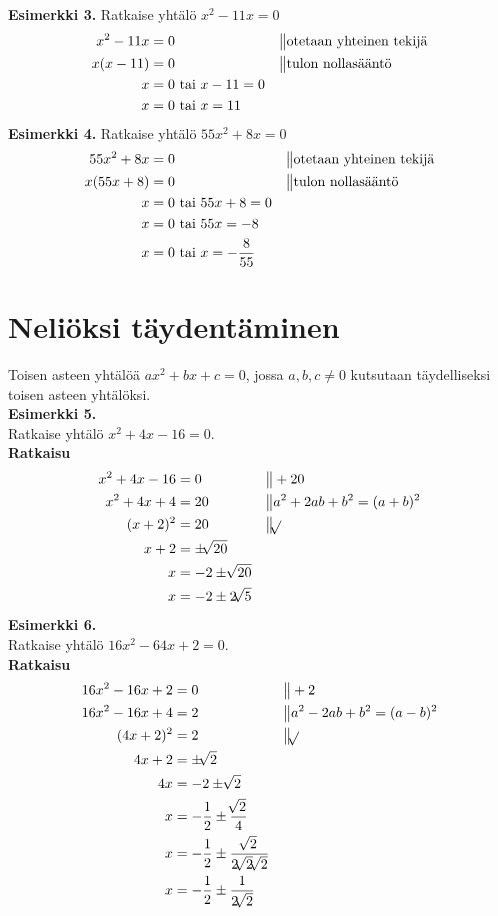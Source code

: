 \textbf{Esimerkki 3.}
Ratkaise yhtälö $x^2-11x=0$
\begin{align*}
x^2-11x&=0 \ \ \ \ \  &&\big\|\text{otetaan yhteinen tekijä} \\
x(x-11)&=0 \ \ \ \ \ &&\big\|\text{tulon nollasääntö} \\
x&=0 \text{ tai } x-11=0 \\
x&=0 \text{ tai } x=11
\end{align*}
\textbf{Esimerkki 4.}
Ratkaise yhtälö $55x^2+8x=0$
\begin{align*}
55x^2+8x&=0 \ \ \ \ \ &&\big\|\text{otetaan yhteinen tekijä} \\
x(55x+8)&=0 \ \ \ \ \ &&\big\|\text{tulon nollasääntö} \\
x&=0 \text{ tai } 55x+8=0 \\
x&=0 \text{ tai } 55x=-8 \\
x&=0 \text{ tai } x=-\frac{8}{55}
\end{align*}
\section{Neliöksi täydentäminen}
Toisen asteen yhtälöä $ax^2+bx+c=0$, jossa $a,b,c \neq 0$ kutsutaan täydelliseksi toisen asteen yhtälöksi. \\
\textbf{Esimerkki 5.} \\
Ratkaise yhtälö $x^2+4x-16=0$. \\
\textbf{Ratkaisu}
\begin{align*}
x^2+4x-16&=0 \ \ \ \ \ &&\big\| +20 \\
x^2+4x+4&=20 \ \ \ \ \ &&\big\| a^2+2ab+b^2=(a+b)^2 \\
(x+2)^2&=20 \ \ \ \ \ &&\big\| \sqrt[]{} \\
x+2 &= \pm \sqrt[]{20} \\
x&=-2 \pm \sqrt[]{20} \\
x&=-2 \pm 2 \sqrt[]{5} \\
\end{align*}
\textbf{Esimerkki 6.} \\
Ratkaise yhtälö $16x^2-64x+2=0$. \\
\textbf{Ratkaisu}
\begin{align*}
16x^2-16x+2&=0 \ \ \ \ \ &&\big\| +2 \\
16x^2-16x+4&=2 \ \ \ \ \ &&\big\| a^2-2ab+b^2=(a-b)^2 \\
(4x+2)^2&=2 \ \ \ \ \ &&\big\| \sqrt[]{} \\
4x+2&=\pm \sqrt[]{2} \\
4x&=-2 \pm \sqrt[]{2} \\
x&=-\frac{1}{2} \pm \frac{\sqrt[]{2}}{4} \\
x&=-\frac{1}{2} \pm \frac{\sqrt[]{2}}{ 2\sqrt[]{2}\sqrt[]{2}} \\
x&=-\frac{1}{2} \pm \frac{1}{2 \sqrt[]{2}} \\
\end{align*}

